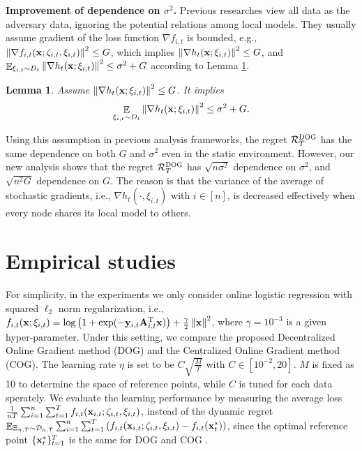 \documentclass{article}
\newtheorem{Lemma}{\bf{Lemma}}
\begin{document}
\textbf{Improvement of dependence on $\sigma^2$.} Previous researches \citep{8015179Shahram,pmlr-v70-zhang17g,tcns-7353155} view all data as the adversary data, ignoring the potential relations among local models. They usually assume gradient of the loss function $\nabla f_{i,t}$ is bounded, e.g., $\left\lVert\nabla f_{i,t}({\bf x};\zeta_{i,t},\xi_{i,t})\right\rVert^2 \le G$, which implies $\left\lVert\nabla h_t({\bf x};\xi_{i,t})\right\rVert^2 \le G$, and $\mathop{\mathbb{E}}_{ \xi_{i,t} \sim D_t }\left\lVert\nabla h_t({\bf x};\xi_{i,t})\right\rVert^2  \le  \sigma^2 + G$ according to Lemma \ref{lemma_assumption_discussion}.  
\begin{Lemma}
\label{lemma_assumption_discussion}
Assume $\left\lVert\nabla h_t({\bf x};\xi_{i,t})\right\rVert^2 \le G$. It implies
\begin{align}
\nonumber
\mathop{\mathbb{E}}_{ \xi_{i,t} \sim D_t }\left\lVert\nabla h_t({\bf x};\xi_{i,t})\right\rVert^2  \le  \sigma^2 + G.
\end{align}
\end{Lemma} Using this assumption in previous analysis frameworks, the regret ${\mathcal{R}}_T^{\textsc{DOG}}$ has the same dependence on both $G$ and $\sigma^2$ even in the static environment. However, our  new analysis shows that the regret ${\mathcal{R}}_T^{\textsc{DOG}}$ has  $\sqrt{n\sigma^2}$ dependence on $\sigma^2$, and $\sqrt{n^2 G}$ dependence on $G$. The reason is that the variance of the average of stochastic gradients, i.e., $\nabla h_t(\cdot, \xi_{i,t})$ with $i\in[n]$, is decreased effectively when every node shares its local model to others. 

 














\section{Empirical studies}


For simplicity, in the experiments we only consider online logistic regression with squared $\ell_2$ norm regularization, i.e., $f_{i,t}({\bf x};\xi_{i,t}) = \log\left( 1+\exp(-{\bf y}_{i,t}{\bf A}_{i,t}^{\rm T} {\bf x}) \right) + \frac{\gamma}{2}\left\lVert{\bf x}\right\rVert^2$, where $\gamma = 10^{-3}$ is a given hyper-parameter. Under this setting, we compare the proposed Decentralized Online Gradient method (DOG) and the Centralized Online Gradient method (COG). 
The learning rate $\eta$ is set to be $C\sqrt{\frac{M}{T}}$ with  $C\in[10^{-2}, 20]$. $M$ is fixed as 10 to determine the space of reference points, while $C$ is tuned for each data sperately. We evaluate the learning performance by measuring the average loss $\frac{1}{nT}\sum_{i=1}^n\sum_{t=1}^T f_{i,t}({\bf x}_{i,t};\zeta_{i,t},\xi_{i,t})$, instead of the dynamic regret $\mathop{\mathbb{E}}_{\Xi_{n,T}\sim \mathcal{D}_{n,T}}\sum_{i=1}^n\sum_{t=1}^T \left(  f_{i,t}({\bf x}_{i,t};\zeta_{i,t},\xi_{i,t}) - f_{i,t}({\bf x}_t^{\ast})  \right)$, since the optimal reference point $\{{\bf x}_t^\ast\}^T_{t=1}$ is the same for DOG and COG .  
\end{document}
